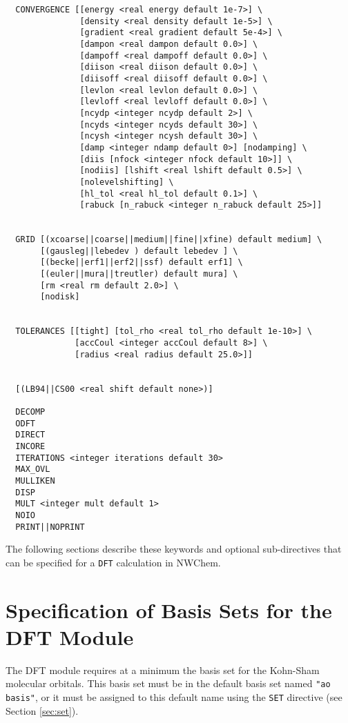 \begin{verbatim}
  CONVERGENCE [[energy <real energy default 1e-7>] \
               [density <real density default 1e-5>] \
               [gradient <real gradient default 5e-4>] \
               [dampon <real dampon default 0.0>] \
               [dampoff <real dampoff default 0.0>] \
               [diison <real diison default 0.0>] \
               [diisoff <real diisoff default 0.0>] \
               [levlon <real levlon default 0.0>] \
               [levloff <real levloff default 0.0>] \
               [ncydp <integer ncydp default 2>] \
               [ncyds <integer ncyds default 30>] \
               [ncysh <integer ncysh default 30>] \
               [damp <integer ndamp default 0>] [nodamping] \
               [diis [nfock <integer nfock default 10>]] \
               [nodiis] [lshift <real lshift default 0.5>] \
               [nolevelshifting] \
               [hl_tol <real hl_tol default 0.1>] \
               [rabuck [n_rabuck <integer n_rabuck default 25>]]


  GRID [(xcoarse||coarse||medium||fine||xfine) default medium] \
       [(gausleg||lebedev ) default lebedev ] \
       [(becke||erf1||erf2||ssf) default erf1] \
       [(euler||mura||treutler) default mura] \
       [rm <real rm default 2.0>] \
       [nodisk]
        

  TOLERANCES [[tight] [tol_rho <real tol_rho default 1e-10>] \
              [accCoul <integer accCoul default 8>] \
              [radius <real radius default 25.0>]]


  [(LB94||CS00 <real shift default none>)]

  DECOMP
  ODFT
  DIRECT
  INCORE
  ITERATIONS <integer iterations default 30>
  MAX_OVL
  MULLIKEN
  DISP
  MULT <integer mult default 1>
  NOIO
  PRINT||NOPRINT
\end{verbatim}

The following 
sections describe these keywords and
optional sub-directives that can be specified for a \verb+DFT+ calculation
in NWChem.

\section{Specification of Basis Sets for the DFT Module}

The DFT module requires at a minimum the basis set for the Kohn-Sham 
molecular orbitals.  This basis set must be in the default basis set named
{\tt "ao basis"}, or it must be assigned to this default name using the
\verb+SET+ directive (see Section \ref{sec:set}).

